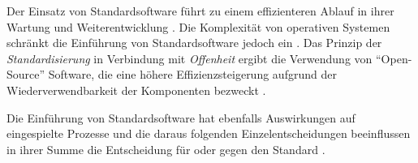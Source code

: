 \begin{enumerate}
    Der Einsatz von Standardsoftware führt zu einem effizienteren Ablauf in ihrer Wartung und Weiterentwicklung \cite{Bussmann2006}. Die Komplexität von operativen Systemen schränkt die Einführung von Standardsoftware jedoch ein \cite[S.27]{Bussmann2006}. Das Prinzip der \emph{Standardisierung} in Verbindung mit \emph{Offenheit} ergibt die Verwendung von \enquote{Open-Source} Software, die eine höhere Effizienzsteigerung aufgrund der Wiederverwendbarkeit der Komponenten bezweckt \cite{Brockhoff2006, Gupta:2017}. 
    
    Die Einführung von Standardsoftware hat ebenfalls Auswirkungen auf eingespielte Prozesse und die daraus folgenden Einzelentscheidungen beeinflussen in ihrer Summe die Entscheidung für oder gegen den Standard \cite[Tab.1]{Manz2018}.
\end{enumerate}